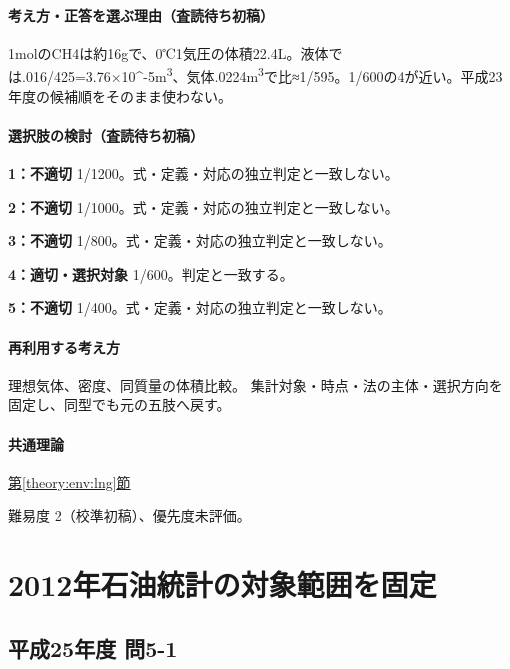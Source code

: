 \paragraph{考え方・正答を選ぶ理由（査読待ち初稿）} 1molのCH4は約16gで、0℃1気圧の体積22.4L。液体では.016/425=\allowbreak{}3.76×10\textasciicircum{}-5m\textsuperscript{3}、気体.0224m\textsuperscript{3}で比≈1/595。1/600の4が近い。平成23年度の候補順をそのまま使わない。

\paragraph{選択肢の検討（査読待ち初稿）}\mbox{}\par

\noindent\textbf{1：不適切} 1/1200。式・定義・対応の独立判定と一致しない。\par

\noindent\textbf{2：不適切} 1/1000。式・定義・対応の独立判定と一致しない。\par

\noindent\textbf{3：不適切} 1/800。式・定義・対応の独立判定と一致しない。\par

\noindent\textbf{4：適切・選択対象} 1/600。判定と一致する。\par

\noindent\textbf{5：不適切} 1/400。式・定義・対応の独立判定と一致しない。\par

\paragraph{再利用する考え方} 理想気体、密度、同質量の体積比較。 集計対象・時点・法の主体・選択方向を固定し、同型でも元の五肢へ戻す。

\paragraph{共通理論} \hyperref[theory:env:lng]{第\ref*{theory:env:lng}節}

\par 難易度 2（校準初稿）、優先度未評価。

\section{2012年石油統計の対象範囲を固定}

\subsection{平成25年度 問5-1}
\label{q:h25-reg-basic-5-1}

